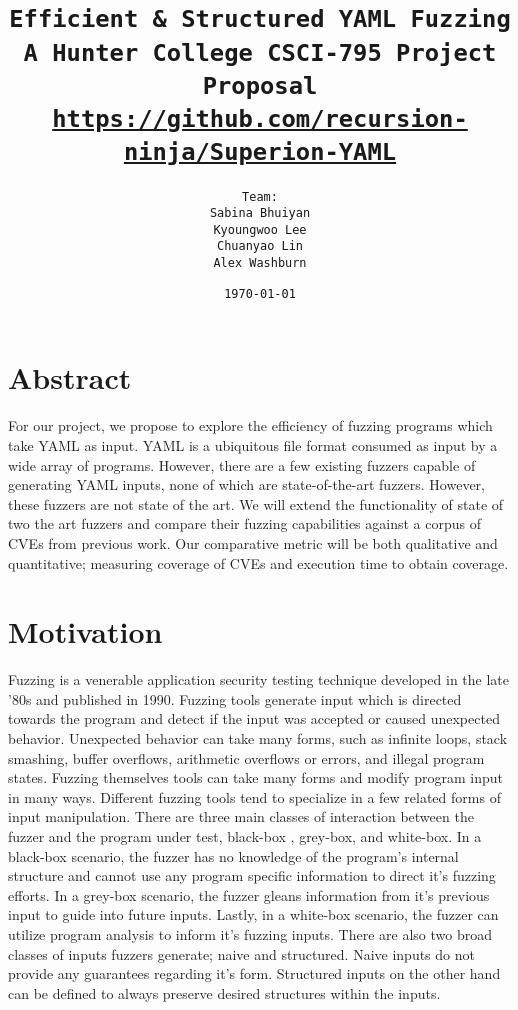 \documentclass[12pt]{diazessay}
\title{\texttt{\huge{Efficient \& Structured YAML Fuzzing} \\\vspace{-0.65cm} {\large A Hunter College CSCI-795 Project Proposal}\\\normalsize\url{https://github.com/recursion-ninja/Superion-YAML}}} %
\author{\texttt{{\Huge Team:}\\\vspace*{-0.5em} 
		Sabina Bhuiyan \\\vspace*{-0.5em} 
		Kyoungwoo Lee \\\vspace*{-0.5em}
		Chuanyao Lin \\\vspace*{-0.25em}
		Alex Washburn}} %
\date{\texttt{\today}} %
\begin{document}
\maketitle %

\vspace{-2cm}
\section*{Abstract}


For our project, we propose to explore the efficiency of fuzzing programs which take YAML as input.
YAML is a ubiquitous file format consumed as input by a wide array of programs.
However, there are a few existing fuzzers capable of generating YAML inputs, none of which are state-of-the-art fuzzers.
However, these fuzzers are not state of the art.
We will extend the functionality of state of two the art fuzzers and compare their fuzzing capabilities against a corpus of CVEs from previous work.
Our comparative metric will be both qualitative and quantitative; measuring coverage of CVEs and execution time to obtain coverage.

\section*{Motivation}

Fuzzing is a venerable application security testing technique developed in the late '80s\cite{Barton1988} and published in 1990\cite{Miller1990}.
Fuzzing tools generate input which is directed towards the program and detect if the input was accepted or caused unexpected behavior.
Unexpected behavior can take many forms, such as infinite loops, stack smashing, buffer overflows, arithmetic overflows or errors, and illegal program states.
Fuzzing themselves tools can take many forms\cite{ModelBasedFuzzing}\cite{GrammarBasedFuzzing}\cite{ProtocolBasedFuzzing} and modify program input in many ways.
Different fuzzing tools tend to specialize in a few related forms of input\cite{InputDiversity} manipulation.
There are three main classes of interaction between the fuzzer and the program under test, black-box \cite{takanen2018fuzzing}, grey-box, and white-box.
In a black-box scenario, the fuzzer has no knowledge of the program's internal structure and cannot use any program specific information to direct it's fuzzing efforts.
In a grey-box scenario, the fuzzer gleans information from it's previous input to guide into future inputs.
Lastly, in a white-box scenario, the fuzzer can utilize program analysis to inform it's fuzzing inputs.
There are also two broad classes of inputs fuzzers generate; naive and structured.
Naive inputs do not provide any guarantees regarding it's form.
Structured inputs on the other hand can be defined to always preserve desired structures within the inputs.
\end{document}
